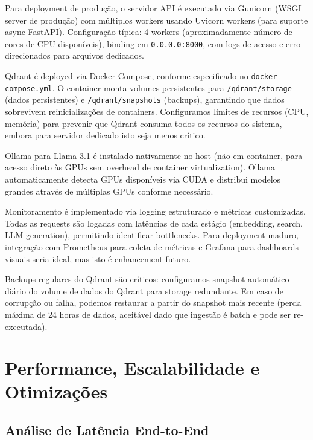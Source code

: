 \documentclass[12pt,a4paper]{article}
\begin{document}
Para deployment de produção, o servidor API é executado via Gunicorn (WSGI server de produção) com múltiplos workers usando Uvicorn workers (para suporte async FastAPI). Configuração típica: 4 workers (aproximadamente número de cores de CPU disponíveis), binding em \texttt{0.0.0.0:8000}, com logs de acesso e erro direcionados para arquivos dedicados.

Qdrant é deployed via Docker Compose, conforme especificado no \texttt{docker-compose.yml}. O container monta volumes persistentes para \texttt{/qdrant/storage} (dados persistentes) e \texttt{/qdrant/snapshots} (backups), garantindo que dados sobrevivem reinicializações de containers. Configuramos limites de recursos (CPU, memória) para prevenir que Qdrant consuma todos os recursos do sistema, embora para servidor dedicado isto seja menos crítico.

Ollama para Llama 3.1 é instalado nativamente no host (não em container, para acesso direto às GPUs sem overhead de container virtualization). Ollama automaticamente detecta GPUs disponíveis via CUDA e distribui modelos grandes através de múltiplas GPUs conforme necessário.

Monitoramento é implementado via logging estruturado e métricas customizadas. Todas as requests são logadas com latências de cada estágio (embedding, search, LLM generation), permitindo identificar bottlenecks. Para deployment maduro, integração com Prometheus para coleta de métricas e Grafana para dashboards visuais seria ideal, mas isto é enhancement futuro.

Backups regulares do Qdrant são críticos: configuramos snapshot automático diário do volume de dados do Qdrant para storage redundante. Em caso de corrupção ou falha, podemos restaurar a partir do snapshot mais recente (perda máxima de 24 horas de dados, aceitável dado que ingestão é batch e pode ser re-executada).

\section{Performance, Escalabilidade e Otimizações}

\subsection{Análise de Latência End-to-End}
\end{document}
